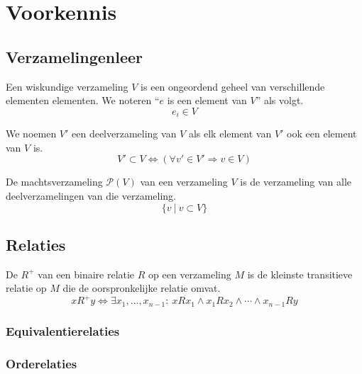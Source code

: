 \documentclass[main.tex]{subfiles}
\begin{document}
\chapter{Voorkennis}
\label{cha:voorkennis}

\section{Verzamelingenleer}
\label{sec:verzamelingenleer}

\begin{de}
  Een wiskundige verzameling $V$ is een ongeordend geheel van verschillende elementen elementen.
  We noteren ``$e$ is een element van $V$'' als volgt.
  \[ e_i \in V \]
\end{de}

\begin{de}
  We noemen $V'$ een deelverzameling van $V$ als elk element van $V'$ ook een element van $V$ is.
  \[ V' \subset V \Leftrightarrow (\forall v' \in V' \Rightarrow v \in V) \]
\end{de}

\begin{de}
  De machtsverzameling $\mathcal{P}(V)$ van een verzameling $V$ is de verzameling van alle deelverzamelingen van die verzameling.
  \[ \{v\ |\ v\subset V \}\] 
\end{de}

\section{Relaties}
\label{sec:relaties}

\begin{de}
  De  $R^{+}$ van een binaire relatie $R$ op een verzameling $M$ is de kleinste transitieve relatie op $M$ die de oorspronkelijke relatie omvat.
  \[ xR^{+}y \Leftrightarrow \exists x_{1},\dotsc,x_{n-1}:\ xRx_{1} \wedge x_{1}Rx_{2} \wedge \dotsb \wedge x_{n-1} R y \]
\end{de}

\subsection{Equivalentierelaties}

\subsection{Orderelaties}
\end{document}
